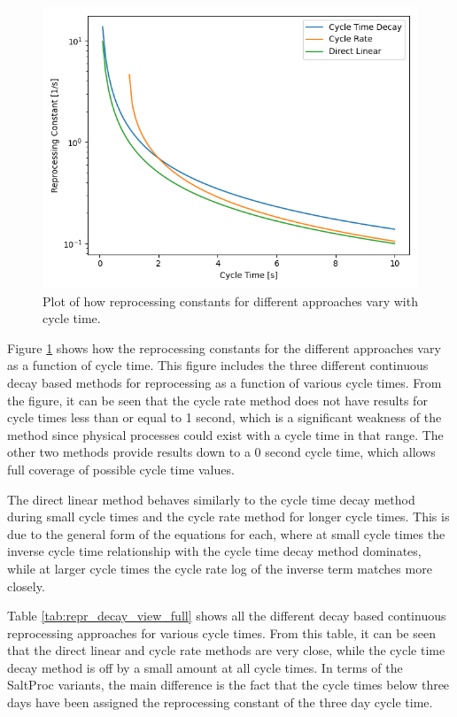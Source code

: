 \begin{figure}[H]
  \centering
  \includegraphics[scale=0.7]{images/cont-compare-cycles.png}
  \caption{Plot of how reprocessing constants for different approaches vary with cycle time.}
   \label{fig:repr_cnst}
\end{figure}

Figure \ref{fig:repr_cnst} shows how the reprocessing constants for the different approaches vary as a function of cycle time.
This figure includes the three different continuous decay based methods for reprocessing as a function of various cycle times. From the figure, it can be seen that the cycle rate method does not have results for cycle times less than or equal to 1 second, which is a significant weakness of the method since physical processes could exist with a cycle time in that range. The other two methods provide results down to a 0 second cycle time, which allows full coverage of possible cycle time values.

The direct linear method behaves similarly to the cycle time decay method during small cycle times and the cycle rate method for longer cycle times. This is due to the general form of the equations for each, where at small cycle times the inverse cycle time relationship with the cycle time decay method dominates, while at larger cycle times the cycle rate log of the inverse term matches more closely.


Table \ref{tab:repr_decay_view_full} shows all the different decay based continuous reprocessing approaches for various cycle times. From this table, it can be seen that the direct linear and cycle rate methods are very close, while the cycle time decay method is off by a small amount at all cycle times. In terms of the SaltProc variants, the main difference is the fact that the cycle times below three days have been assigned the reprocessing constant of the three day cycle time.

